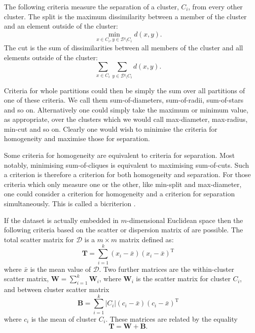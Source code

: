 \documentclass[a4paper]{report}
\newcommand{\dset}{\mathcal{D}}
\begin{document}
The following criteria measure the separation of a cluster, $C_i$, from every
other cluster.  The split is the maximum dissimilarity between a member of the
cluster and an element outside of the cluster:
\begin{equation*}
  \min_{x \in C_i, y \in \dset \setminus C_i} d(x,y).
\end{equation*}
The cut is the sum of dissimilarities between all members of the cluster and
all elements outside of the cluster:
\begin{equation*}
  \sum_{x \in C_i} \sum_{y \in \dset \setminus C_i} d(x,y).
\end{equation*}

Criteria for whole partitions could then be simply the sum over all partitions
of one of these criteria.  We call them sum-of-diameters, sum-of-radii,
sum-of-stars and so on.  Alternatively one could simply take the maximum or
minimum value, as appropriate, over the clusters which we would call
max-diameter, max-radius, min-cut and so on.  Clearly one would wish to
minimise the criteria for homogeneity and maximise those for separation.

Some criteria for homogeneity are equivalent to criteria for separation.  Most
notably, minimising sum-of-cliques is equivalent to maximising sum-of-cuts.
Such a criterion is therefore a criterion for both homogeneity and separation.
For those criteria which only measure one or the other, like min-split and
max-diameter, one could consider a criterion for homogeneity and a criterion
for separation simultaneously.  This is called a bicriterion
\citep{delattre1980bicriterion}.

If the dataset is actually embedded in $m$-dimensional Euclidean space then
the following criteria based on the scatter or dispersion matrix of
\citet{wilks60} are possible.  The total scatter matrix for $\dset$ is a $m
\times m$ matrix defined
as:
\begin{equation*}
  \mathbf{T} = \sum_{i=1}^{k} (x_i - \bar{x})(x_i - \bar{x})^{\mathrm{T}}
\end{equation*}
where $\bar{x}$ is the mean value of $\dset$.  Two further matrices are
the within-cluster scatter matrix, $\mathbf{W} = \sum_{i=1}^{k} \mathbf{W}_i$,
where $\mathbf{W}_i$ is the scatter matrix for cluster $C_i$, and between
cluster scatter matrix
\begin{equation*}
  \mathbf{B} =
  \sum_{i=1}^{k} |C_i| (c_i - \bar{x}) (c_i - \bar{x})^{\mathrm{T}}
\end{equation*}
where $c_i$ is the mean of cluster $C_i$.  These matrices are related by the
equality
\begin{equation*}
  \mathbf{T} = \mathbf{W} + \mathbf{B}.
\end{equation*}
\end{document}
